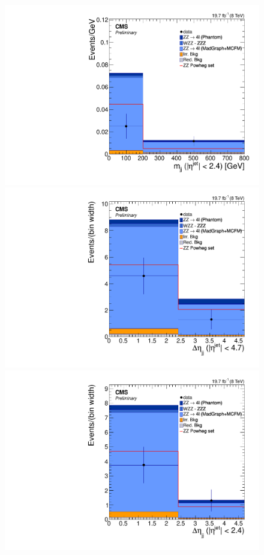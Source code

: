 \begin{figure}[hbtp]
\begin{center}
    \includegraphics[width=\cmsFigWidth]{Figures/CentralMjj_mad} 
    \includegraphics[width=\cmsFigWidth]{Figures/Deta_mad}  
    \includegraphics[width=\cmsFigWidth]{Figures/CentralDeta_mad}  

\end{center}
\end{figure}
